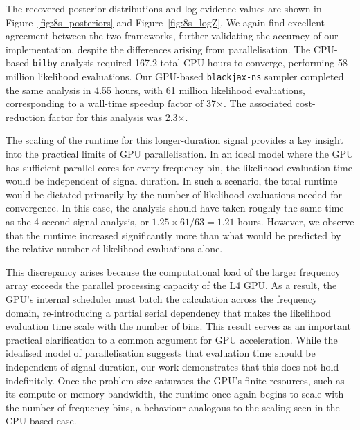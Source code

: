 \documentclass[fleqn,usenatbib]{mnras}
\begin{document}
The recovered posterior distributions and log-evidence values are shown
in Figure~\ref{fig:8s_posteriors} and Figure~\ref{fig:8s_logZ}. We again
find excellent agreement between the two frameworks, further validating
the accuracy of our implementation, despite the differences arising from 
parallelisation. The CPU-based \texttt{bilby} analysis required 167.2 total CPU-hours to
converge, performing 58 million likelihood evaluations. Our GPU-based
\texttt{blackjax-ns} sampler completed the same analysis in 4.55 hours, with 61 million likelihood evaluations,
corresponding to a wall-time speedup factor of 37$\times$. 
The associated cost-reduction factor for this
analysis was 2.3$\times$. 

The scaling of the runtime for this longer-duration signal provides a
key insight into the practical limits of GPU parallelisation. In an
ideal model where the GPU has sufficient parallel cores for every
frequency bin, the likelihood evaluation time would be independent of
signal duration. In such a scenario, the total runtime would be dictated
primarily by the number of likelihood evaluations needed for convergence.
In this case, the analysis should have taken roughly the same
time as the 4-second signal analysis, or $1.25 \times 61/63 = 1.21$ hours. 
However, we observe that the runtime increased significantly more than
what would be predicted by the relative number of likelihood evaluations alone.


This discrepancy arises because the computational load of the larger
frequency array exceeds the parallel processing capacity of the L4 GPU.
As a result, the GPU's internal scheduler must batch the calculation
across the frequency domain, re-introducing a partial serial dependency
that makes the likelihood evaluation time scale with the number of bins.
This result serves as an important practical clarification to a common
argument for GPU acceleration. While the idealised model of
parallelisation suggests that evaluation time should be independent of
signal duration, our work demonstrates that this does not hold
indefinitely. Once the problem size saturates the GPU's finite
resources, such as its compute or memory bandwidth, the runtime once
again begins to scale with the number of frequency bins, a behaviour
analogous to the scaling seen in the CPU-based case.

\end{document}
